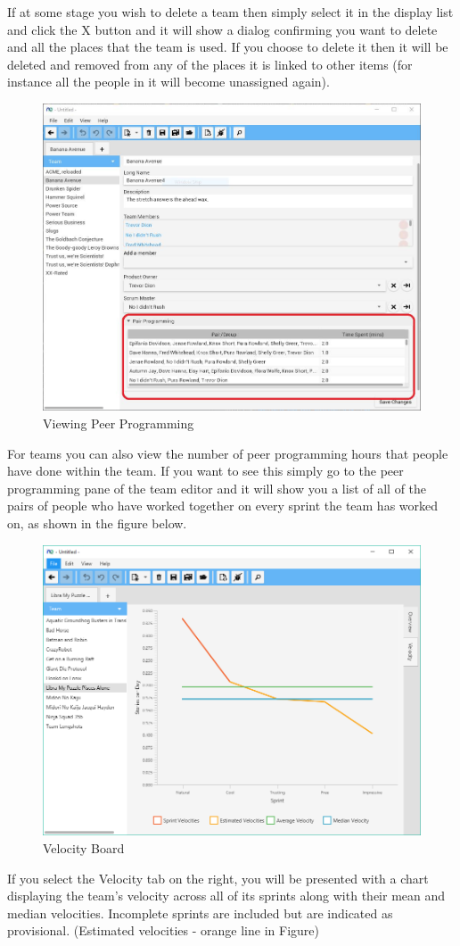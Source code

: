 If at some stage you wish to delete a team then simply select it in the display list and click the X button and it will show a dialog confirming you want to delete and all the places that the team is used. If you choose to delete it then it will be deleted and removed from any of the places it is linked to other items (for instance all the people in it will become unassigned again).

\begin{figure}[h]
	\centering
	\includegraphics[width=\textwidth]{images/screenshots/teams6.PNG}
	\caption{Viewing Peer Programming}
	\label{fig:new_project}
\end{figure}

For teams you can also view the number of peer programming hours that people have done within the team. If you want to see this simply go to the peer programming pane of the team editor and it will show you a list of all of the pairs of people who have worked together on every sprint the team has worked on, as shown in the figure below.

\begin{figure}[h]
	\centering
	\includegraphics[width=\textwidth]{images/screenshots/velocity_board.PNG}
	\caption{Velocity Board}
	\label{fig:new_project}
\end{figure}

If you select the Velocity tab on the right, you will be presented with a chart displaying the team's velocity across all of its sprints along with their mean and median velocities. Incomplete sprints are included but are indicated as provisional. (Estimated velocities - orange line in Figure)